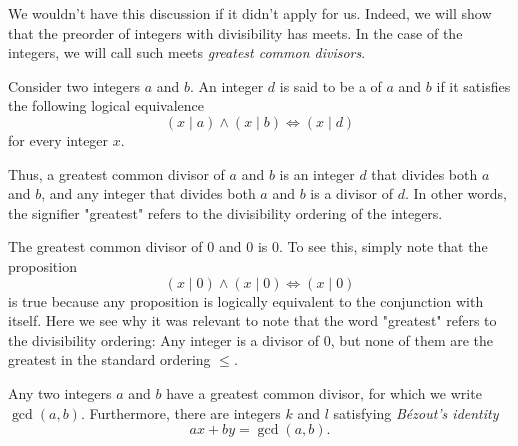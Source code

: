We wouldn't have this discussion if it didn't apply for us. Indeed, we will show that the preorder of integers with divisibility has meets. In the case of the integers, we will call such meets \emph{greatest common divisors}.

\begin{definition}
  Consider two integers $a$ and $b$. An integer $d$ is said to be a  of $a$ and $b$ if it satisfies the following logical equivalence
  \begin{equation*}
    (x\mid a)\land(x\mid b) \Leftrightarrow (x\mid d)
  \end{equation*}
  for every integer $x$.
\end{definition}

Thus, a greatest common divisor of $a$ and $b$ is an integer $d$ that divides both $a$ and $b$, and any integer that divides both $a$ and $b$ is a divisor of $d$. In other words, the signifier "greatest" refers to the divisibility ordering of the integers.

\begin{example}
  The greatest common divisor of $0$ and $0$ is $0$. To see this, simply note that the proposition
  \begin{equation*}
    (x\mid 0)\land(x\mid 0) \Leftrightarrow (x\mid 0)
  \end{equation*}
  is true because any proposition is logically equivalent to the conjunction with itself. Here we see why it was relevant to note that the word "greatest" refers to the divisibility ordering: Any integer is a divisor of $0$, but none of them are the greatest in the standard ordering $\leq$.
\end{example}

\begin{theorem}\label{theorem:definition-gcd}
  Any two integers $a$ and $b$ have a greatest common divisor, for which we write $\gcd(a,b)$. Furthermore, there are integers $k$ and $l$ satisfying \emph{B\'ezout's identity}
  \begin{equation*}
    ax+by = \gcd(a,b).
  \end{equation*}
\end{theorem}

